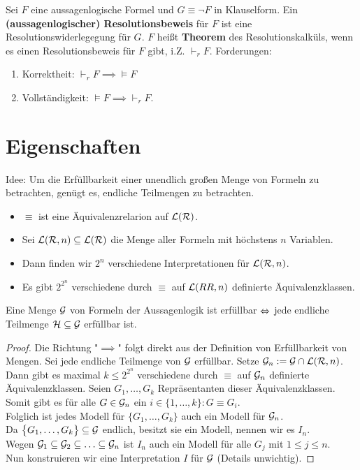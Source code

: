 \begin{definition}\label{def3.34}
	Sei $F$ eine aussagenlogische Formel und $G\equiv\neg F$ in Klauselform.
	Ein \textbf{(aussagenlogischer) Resolutionsbeweis} für $F$ ist eine Resolutionswiderlegegung für $G$.
	$F$ heißt \textbf{Theorem} des Resolutionskalküls, wenn es einen Resolutionsbeweis für $F$ gibt, i.Z. $\vdash_r F$.\nl
	Forderungen:
	\begin{enumerate}
		\item Korrektheit: $\vdash_r F\implies\models F$
		\item Vollständigkeit: $\models F\implies\vdash_r F$.
	\end{enumerate}
\end{definition}

\section{Eigenschaften}

Idee: Um die Erfüllbarkeit einer unendlich großen Menge von Formeln zu betrachten, genügt es, endliche Teilmengen zu betrachten.

\begin{itemize}
	\item $\equiv$ ist eine Äquivalenzrelarion auf $\mathcal{L}(\mathcal{R})$.
	\item Sei $\mathcal{L}(\mathcal{R},n)\subseteq\mathcal{L}(\mathcal{R})$ die Menge aller Formeln mit höchstens $n$ Variablen.
	\item Dann finden wir $2^n$ verschiedene Interpretationen für $\mathcal{L}(\mathcal{R},n)$.
	\item Es gibt $2^{2^n}$ verschiedene durch $\equiv$ auf $\mathcal{L}(RR,n)$ definierte Äquivalenzklassen.
\end{itemize}

\begin{satz}[Endlichkeitssatz]\label{satz345Endlichkeitssatz}\enter
	Eine Menge $\mathcal{G}$ von Formeln der Aussagenlogik ist erfüllbar $\Leftrightarrow$ jede endliche Teilmenge $\mathcal{H}\subseteq\mathcal{G}$ erfüllbar ist.
\end{satz}

\begin{proof}
	Die Richtung "$\implies$" folgt direkt aus der Definition von Erfüllbarkeit von Mengen.\nl
	Sei jede endliche Teilmenge von $\mathcal{G}$ erfüllbar.
	Setze $\mathcal{G}_n:=\mathcal{G}\cap\mathcal{L}(\mathcal{R},n)$.\\
	Dann gibt es maximal $k\leq 2^{2^n}$ verschiedene durch $\equiv$ auf $\mathcal{G}_n$ definierte Äquivalenzklassen.
	Seien $G_1,\ldots,G_k$ Repräsentanten dieser Äquivalenzklassen.\\
	Somit gibt es für alle $G\in\mathcal{G}_n$ ein $i\in\lbrace 1,\ldots,k\rbrace:G\equiv G_i$.\\
	Folglich ist jedes Modell für $\big\lbrace G_1,\ldots,G_k\big\rbrace$ auch ein Modell für $\mathcal{G}_n$.\\
	Da $\big\lbrace G_1,\ldots,G_k\big\rbrace\subseteq\mathcal{G}$ endlich, besitzt sie ein Modell, nennen wir es $I_n$.\\
	Wegen $\mathcal{G}_1\subseteq\mathcal{G}_2\subseteq\ldots\subseteq\mathcal{G}_n$ ist $I_n$ auch ein Modell für alle $G_j$ mit $1\leq j\leq n$.\\
	Nun konstruieren wir eine Interpretation $I$ für $\mathcal{G}$ (Details unwichtig).
\end{proof}

